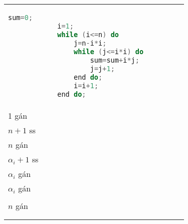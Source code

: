 \documentclass[../HW01.tex]{subfiles}
\begin{document}
\begin{tabular}{l l}
    \begin{minipage}{0.7\textwidth}
        \begin{lstlisting}[language=C]
            sum=0;
            i=1;
            while (i<=n) do
                j=n-i*i;
                while (j<=i*i) do
                    sum=sum+i*j;
                    j=j+1;
                end do;
                i=i+1;
            end do;                     
    \end{lstlisting}
    \end{minipage} 
    &
    \begin{minipage}{0.5\textwidth}
        \texttt{1 gán
            \\1 gán
            \\{\color{purple} $n+1$ ss}
            \\$n$ gán
            \\{\color{purple} $\alpha_i+1$ ss}
            \\$\alpha_i$ gán
            \\$\alpha_i$ gán
            \\
            \\$n$ gán
            \\
            \\
        }
    \end{minipage}
\end{tabular}
\end{document}
